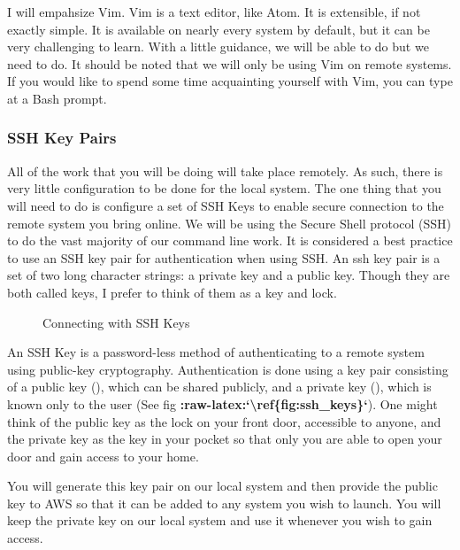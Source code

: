 \documentclass[letterpaper,10pt,english]{sphinxmanual}
\begin{document}
I will empahsize Vim. Vim is a text editor, like Atom. It is extensible,
if not exactly simple. It is available on nearly every system by
default, but it can be very challenging to learn. With a little
guidance, we will be able to do but we need to do. It should be noted
that we will only be using Vim on remote systems. If you would like to
spend some time acquainting yourself with Vim, you can type 
at a Bash prompt.


\subsubsection{SSH Key Pairs}
\label{\detokenize{01-amazon-web-services:SSH-Key-Pairs}}
All of the work that you will be doing will take place remotely. As
such, there is very little configuration to be done for the local
system. The one thing that you will need to do is configure a set of SSH
Keys to enable secure connection to the remote system you bring online.
We will be using the Secure Shell protocol (SSH) to do the vast majority
of our command line work. It is considered a best practice to use an SSH
key pair for authentication when using SSH. An ssh key pair is a set of
two long character strings: a private key and a public key. Though they
are both called keys, I prefer to think of them as a key and lock.

\begin{figure}[htbp]
\centering
\capstart

\noindent{}
\caption{Connecting with SSH Keys}\label{\detokenize{01-amazon-web-services:id31}}\end{figure}

An SSH Key is a password-less method of authenticating to a remote
system using public-key cryptography. Authentication is done using a key
pair consisting of a public key (), which can be shared
publicly, and a private key (), which is known only to the
user (See fig {\color{red}\bfseries{}:raw-latex:{}`\textbackslash{}ref\{fig:ssh\_keys\}{}`}). One might think of the
public key as the lock on your front door, accessible to anyone, and the
private key as the key in your pocket so that only you are able to open
your door and gain access to your home.

You will generate this key pair on our local system and then provide the
public key to AWS so that it can be added to any system you wish to
launch. You will keep the private key on our local system and use it
whenever you wish to gain access.
\end{document}
